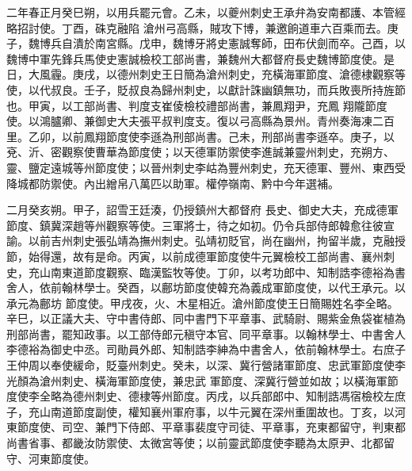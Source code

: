 \begin{pinyinscope}
 二年春正月癸巳朔，以用兵罷元會。乙未，以夔州刺史王承弁為安南都護、本管經略招討使。丁酉，硃克融陷
 滄州弓高縣，賊攻下博，兼邀餉道車六百乘而去。庚子，魏博兵自潰於南宮縣。戊申，魏博牙將史憲誠奪師，田布伏劍而卒。己酉，以魏博中軍先鋒兵馬使史憲誠檢校工部尚書，兼魏州大都督府長史魏博節度使。是日，大風霾。庚戌，以德州刺史王日簡為滄州刺史，充橫海軍節度、滄德棣觀察等使，以代叔良。壬子，貶叔良為歸州刺史，以獻計誅幽鎮無功，而兵敗喪所持旌節也。甲寅，以工部尚書、判度支崔倰檢校禮部尚書，兼鳳翔尹，充鳳
 翔隴節度使。以鴻臚卿、兼御史大夫張平叔判度支。復以弓高縣為景州。青州奏海凍二百里。乙卯，以前鳳翔節度使李遜為刑部尚書。己未，刑部尚書李遜卒。庚子，以兗、沂、密觀察使曹華為節度使；以天德軍防禦使李進誠兼靈州刺史，充朔方、靈、鹽定遠城等州節度使；以晉州刺史李岵為豐州刺史，充天德軍、豐州、東西受降城都防禦使。內出繒帛八萬匹以助軍。權停嶺南、黔中今年選補。



 二月癸亥朔。甲子，詔雪王廷湊，仍授鎮州大都督府
 長史、御史大夫，充成德軍節度、鎮冀深趙等州觀察等使。三軍將士，待之如初。仍令兵部侍郎韓愈往彼宣諭。以前吉州刺史張弘靖為撫州刺史。弘靖初貶官，尚在幽州，拘留半歲，克融授節，始得還，故有是命。丙寅，以前成德軍節度使牛元翼檢校工部尚書、襄州刺史，充山南東道節度觀察、臨漢監牧等使。丁卯，以考功郎中、知制誥李德裕為書舍人，依前翰林學士。癸酉，以鄜坊節度使韓充為義成軍節度使，以代王承元。以承元為鄜坊
 節度使。甲戌夜，火、木星相近。滄州節度使王日簡賜姓名李全略。辛巳，以正議大夫、守中書侍郎、同中書門下平章事、武騎尉、賜紫金魚袋崔植為刑部尚書，罷知政事。以工部侍郎元稹守本官、同平章事。以翰林學士、中書舍人李德裕為御史中丞。司勛員外郎、知制誥李紳為中書舍人，依前翰林學士。右庶子王仲周以奉使緩命，貶臺州刺史。癸未，以深、冀行營諸軍節度、忠武軍節度使李光顏為滄州刺史、橫海軍節度使，兼忠武
 軍節度、深冀行營並如故；以橫海軍節度使李全略為德州刺史、德棣等州節度。丙戌，以兵部郎中、知制誥馮宿檢校左庶子，充山南道節度副使，權知襄州軍府事，以牛元翼在深州重圍故也。丁亥，以河東節度使、司空、兼門下侍郎、平章事裴度守司徒、平章事，充東都留守，判東都尚書省事、都畿汝防禦使、太微宮等使；以前靈武節度使李聽為太原尹、北都留守、河東節度使。




\end{pinyinscope}
